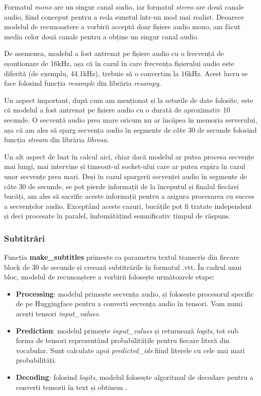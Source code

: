 \par
Formatul \textit{mono} are un singur canal audio, iar formatul \textit{stereo} are două canale audio, 
fiind conceput pentru a reda sunetul într-un mod mai realist. Deoarece modelul de recunoaștere a vorbirii
acceptă doar fișiere audio mono, am făcut media celor două canale pentru a obține un singur canal audio.

\par
De asemenea, modelul a fost antrenat pe fișiere audio cu o frecvență de eșantionare de 16kHz, așa că
în cazul în care frecvența fișierului audio este diferită (de exemplu, 44.1kHz), trebuie să o convertim
la 16kHz. Acest lucru se face folosind funcția \textit{resample} din librăria \textit{resampy}.

\par
Un aspect important, după cum am menționat și la seturile de date folosite, este că modelul a fost
antrenat pe fișiere audio cu o durată de aproximativ 10 secunde. O secvență audio prea mare oricum
nu ar încăpea în memoria serverului, așa că am ales să sparg secvența audio în segmente de câte 30 de
secunde folosind funcția \textit{stream} din librăria \textit{librosa}.

\par
Un alt aspect de luat în calcul aici, chiar dacă modelul ar putea procesa secvențe mai lungi, mai
intervine și timeout-ul socket-ului care ar putea expira în cazul unor secvențe prea mari. Deși în
cazul spargerii secvenței audio în segmente de câte 30 de secunde, se pot pierde informații de 
la începutul și finalul fiecărei bucăți, am ales să sacrific aceste informații pentru a asigura
procesarea cu succes a secvențelor audio. Exceptând aceste cazuri, bucățile pot fi tratate independent
și deci procesate în paralel, îmbunătățind semnificativ timpul de răspuns.

\subsubsection{Subtitrări}
\label{subsec:subtitles}
\par
Funcția \textbf{make\_subtitles} primește ca parametru textul transcris din fiecare block de 30 de secunde
și creează subtitrările în formatul .vtt. În cadrul unui bloc, modelul de recunoaștere a vorbirii 
folosește următoarele etape:
\begin{itemize}
    \item \textbf{Processing}: modelul primește secvența audio, și folosește procesorul specific de pe
    Huggingface pentru a converti secvența audio în tensori. Vom numi acești tensori \textit{input\_values}.
    \item \textbf{Prediction}: modelul primește \textit{input\_values} și returnează \textit{logits}, tot
    sub forma de tensori reprezentând probabilitățile pentru fiecare literă din vocabular. Sunt calculate
    apoi \textit{predicted\_ids} fiind literele cu cele mai mari probabilități.
    \item \textbf{Decoding}: folosind \textit{logits}, modelul folosește algoritmul de decodare pentru a
    converti tensorii în text și obtinem .
\end{itemize}

